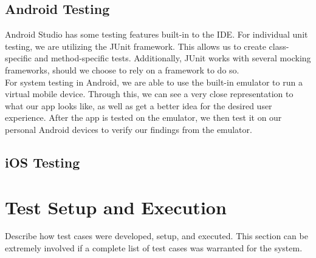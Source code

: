 \subsection{Android Testing}
Android Studio has some testing features built-in to the IDE. For individual unit testing, we are utilizing the JUnit framework. This allows us to create class-specific and method-specific tests. Additionally, JUnit works with several mocking frameworks, should we choose to rely on a framework to do so.\\

For system testing in Android, we are able to use the built-in emulator to run a virtual mobile device. Through this, we can see a very close representation to what our app looks like, as well as get a better idea for the desired user experience. After the app is tested on the emulator, we then test it on our personal Android devices to verify our findings from the emulator.

\subsection{iOS Testing}

\section{Test Setup and Execution}
Describe how test cases were developed, setup, and executed.  This section can 
be extremely involved if a complete list of test cases was warranted for the system. 


